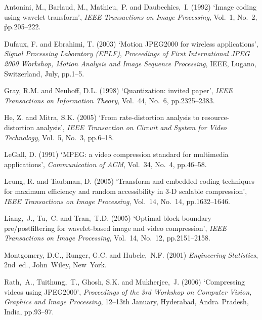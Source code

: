 \documentclass{doublecol-new}
\theoremstyle{TH}{
\newtheorem{lemma}{Lemma}[section]
\newtheorem{theorem}{Theorem}
\newtheorem{corrolary}{Corrolary}
\newtheorem{conjecture}[lemma]{Conjecture}
\newtheorem{proposition}[lemma]{Proposition}
\newtheorem{claim}[lemma]{Claim}
\newtheorem{stheorem}[lemma]{Wrong Theorem}
}
\theoremstyle{THrm}{
\newtheorem{definition}{Definition}[section]
\newtheorem{question}{Question}[section]
\newtheorem{remark}{Remark}[section]
\newtheorem{scheme}{Scheme}
}
\theoremstyle{THhit}{
\newtheorem{case}{Case}[section]
}
\begin{document}
\begin{thebibliography}{10}

Antonini, M., Barlaud, M., Mathieu,~P. and Daubechies,~I. (1992) `Image coding
using wavelet transform', {\it IEEE  Transactions on Image Processing}, Vol.~1,
No.~2, \h{pp.205--222}.


Dufaux, F. and Ebrahimi, T. (2003) `Motion JPEG2000 for wireless applications',
{\it Signal Processing Laboratory (EPLF)}, {\it Proceedings of First
International JPEG 2000 Workshop, Motion Analysis and Image Sequence
Processing}, IEEE, Lugano, Switzerland, July, pp.1--5.%

Gray, R.M. and Neuhoff, D.L. (1998) `Quantization: invited paper', {\it IEEE
Transactions on Information Theory}, Vol.~44, No.~6, pp.2325--2383.

He, Z. and Mitra, S.K. (2005) `From rate-distortion analysis to
resource-distortion analysis', {\it IEEE Transaction on Circuit and
System for Video Technology}, Vol.~5, No.~3, pp.6--18.

LeGall, D. (1991) `MPEG: a video compression standard for multimedia
applications', {\it Communication of ACM}, Vol.~34, No.~4, pp.46--58.

Leung, R. and Taubman, D. (2005) `Transform and embedded coding techniques for
maximum efficiency and random accessibility in 3-D scalable compression', {\it
IEEE Transactions on Image Processing}, Vol.~14, No.~14, pp.1632--1646.

Liang,~J., Tu,~C. and Tran,~T.D. (2005) `Optimal block boundary
pre/postfiltering for wavelet-based image and video compression', {\it IEEE
Transactions on Image Processing}, Vol.~14, No.~12, pp.2151--2158.

Montgomery, D.C., Runger, G.C. and Hubele,~N.F. (2001) {\it Engineering
Statistics}, 2nd~ed., John~Wiley, New~York.

Rath,~A., Tuithung,~T., Ghosh, S.K. and Mukherjee,~J. (2006)
`Compressing videos using JPEG2000', {\it Proceedings of the 3rd
Workshop on Computer Vision, Graphics and Image Processing}, 12--13th
January, Hyderabad, Andra~Pradesh, India, pp.93--97.


\end{thebibliography}
\end{document}
